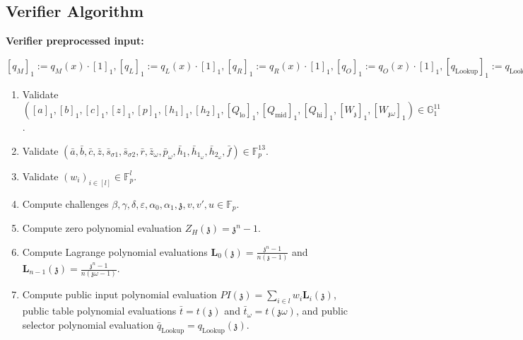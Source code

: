 \documentclass[fleqn]{article}
\begin{document}
		\subsection{Verifier Algorithm}
 
			\textbf{Verifier preprocessed input:} 

				$[q_M]_1 := q_M(x)\cdot[1]_1, [q_L]_1 := q_L(x)\cdot[1]_1,  [q_R]_1 := q_R(x)\cdot[1]_1, 
				[q_O]_1 := q_O(x)\cdot[1]_1, [q_\text{Lookup}]_1 := q_\text{Lookup}(x)\cdot[1]_1, [s_{\sigma 1}]_1 := s_{\sigma 1}(x)\cdot[1]_1, 
				[s_{\sigma 2}]_1 := s_{\sigma 2}(x)\cdot[1]_1, [s_{\sigma 3}]_1 := s_{\sigma 1}(3)\cdot[1]_1, [t]_1 := t(x)\cdot[1]_1, x\cdot[1]_2$

             		\begin{enumerate}
				\item Validate $([a]_1, [b]_1, [c]_1, [z]_1, [p]_1, [h_1]_1,[h_2]_1, [Q_{\text{lo}}]_1, [Q_{\text{mid}}]_1, [Q_{\text{hi}}]_1, [W_\mathfrak{z}]_1, [W_{\mathfrak{z}\omega}]_1)\in \mathbb{G}^{11}_1$.
				            
				\item Validate $(\bar{a}, \bar{b}, \bar{c}, \bar{z}, \bar{s}_{\sigma 1}, \bar{s}_{\sigma 2}, \bar{r}, \bar{z}_\omega, \bar{p}_\omega, \bar{h}_1, \bar{h}_{1_\omega}, \bar{h}_{2_\omega}, \bar{f}) \in \mathbb{F}_p^{13}$.
				            
				\item Validate $(w_i)_{i\in[l]}\in\mathbb{F}^l_p$.
				            
				\item Compute challenges $\beta, \gamma, \delta, \varepsilon, \alpha_0, \alpha_1, \mathfrak{z}, v, v', u \in \mathbb{F}_p$.
				            
				\item Compute zero polynomial evaluation $Z_H(\mathfrak{z}) = \mathfrak{z}^n-1$.
				            
				\item Compute Lagrange polynomial evaluations $\textbf{L}_0(\mathfrak{z}) = \frac{\mathfrak{z}^n-1}{n(\mathfrak{z}-1)}$ and $\textbf{L}_{n-1}(\mathfrak{z}) = \frac{\mathfrak{z}^n-1}{n(\mathfrak{z}\omega-1)}$.
				            
				\item Compute public input polynomial evaluation $PI(\mathfrak{z})=\sum_{i\in l}w_i\textbf{L}_i(\mathfrak{z})$, public table polynomial evaluations $\bar{t} = t(\mathfrak{z})$ and $\bar{t}_\omega = t(\mathfrak{z\omega})$, and public selector polynomial evaluation $\bar{q}_\text{Lookup} = q_\text{Lookup}(\mathfrak{z})$.
				            

\end{enumerate}
\end{document}
